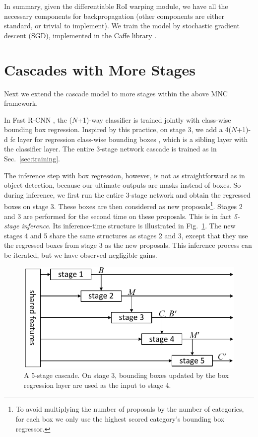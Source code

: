 \documentclass[10pt,twocolumn,letterpaper]{article}
\begin{document}
\vspace{1em}
In summary, given the differentiable RoI warping module, we have all the necessary components for backpropagation (other components are either standard, or trivial to implement). We train the model by stochastic gradient descent (SGD), implemented in the Caffe library \cite{Jia2014}.

\section{Cascades with More Stages}
\label{sec:morestages}

Next we extend the cascade model to more stages within the above MNC framework.

In Fast R-CNN \cite{Girshick2015}, the ($N$+1)-way classifier is trained jointly with class-wise bounding box regression. Inspired by this practice, on stage 3, we add a 4($N$+1)-d fc layer for regression class-wise bounding boxes \cite{Girshick2015}, which is a sibling layer with the classifier layer. The entire 3-stage network cascade is trained as in Sec.~\ref{sec:training}.

The inference step with box regression, however, is not as straightforward as in object detection, because our ultimate outputs are masks instead of boxes. So during inference, we first run the entire 3-stage network and obtain the regressed boxes on stage 3. These boxes are then considered as new proposals\footnote{To avoid multiplying the number of proposals by the number of categories, for each box we only use the highest scored category's bounding box regressor.}.
Stages 2 and 3 are performed for the second time on these proposals.
This is in fact \emph{5-stage inference}. Its inference-time structure is illustrated in Fig.~\ref{fig:5stage}. The new stages 4 and 5 share the same structures as stages 2 and 3, except that they use the regressed boxes from stage 3 as the new proposals. This inference process can be iterated, but we have observed negligible gains.

\begin{figure}
\begin{center}
\includegraphics[width=0.85\linewidth]{figure/5stage}
\end{center}
\vspace{-1em}
\caption{A 5-stage cascade. On stage 3, bounding boxes updated by the box regression layer are used as the input to stage 4.}
\label{fig:5stage}
\end{figure}
\end{document}
